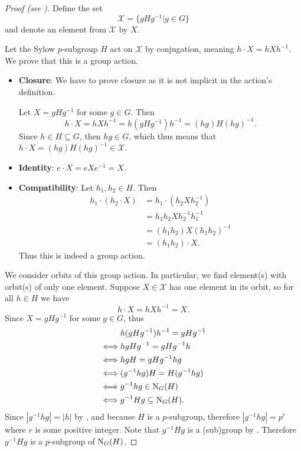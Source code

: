 \begin{proof}[Proof (see {\cite[Theorem 11.10]{humphreys_1996}})]
    Define the set
    \[
        \mathcal{X} = \{gHg^{-1} \vert g \in G\}
    \]
    and denote an element from $\mathcal{X}$ by $X$.

    Let the Sylow $p$-subgroup $H$ act on $\mathcal{X}$ by conjugation, meaning $h \cdot X = hXh^{-1}$. We prove that this is a group action.

    \begin{itemize}
        \item \textbf{Closure}: We have to prove closure as it is not implicit in the action's definition.

        Let $X = gHg^{-1}$ for some $g \in G$. Then
        \[
            h\cdot X = hXh^{-1} = h(gHg^{-1})h^{-1} = (hg)H(hg)^{-1}.
        \]
        Since $h \in H \subseteq G$, then $hg \in G$, which thus means that $h \cdot X = (hg)H(hg)^{-1} \in \mathcal{X}$.

        \item \textbf{Identity}: $e \cdot X = eXe^{-1} = X$.

        \item \textbf{Compatibility}: Let $h_1, h_2 \in H$. Then
        \begin{align*}
            h_1 \cdot (h_2 \cdot X) &= h_1 \cdot (h_2Xh_2^{-1})\\
            &= h_1h_2Xh_2^{-1}h_1^{-1}\\
            &= (h_1h_2)X(h_1h_2)^{-1}\\
            &= (h_1h_2) \cdot X.
        \end{align*}
        Thus this is indeed a group action.
    \end{itemize}

    We consider orbits of this group action. In particular, we find element(s) with orbit(s) of only one element. Suppose $X \in \mathcal{X}$ has one element in its orbit, so for all $h \in H$ we have
    \[
        h\cdot X = hXh^{-1} = X.
    \]
    Since $X = gHg^{-1}$ for some $g \in G$, thus
    \begin{align*}
        &h(gHg^{-1})h^{-1} = gHg^{-1}\\
        \iff&hgHg^{-1} = gHg^{-1}h\\
        \iff&hgH = gHg^{-1}hg\\
        \iff&(g^{-1}hg)H = H(g^{-1}hg)\\
        \iff&g^{-1}hg \in \mathrm{N}_{G}(H)\\
        \iff&g^{-1}Hg \subseteq \mathrm{N}_{G}(H).
    \end{align*}
    Since $|g^{-1}hg| = |h|$ by , and because $H$ is a $p$-subgroup, therefore $|g^{-1}hg| = p^r$ where $r$ is some positive integer. Note that $g^{-1}Hg$ is a (sub)group by . Therefore $g^{-1}Hg$ is a $p$-subgroup of $\mathrm{N}_{G}(H)$.


\end{proof}
